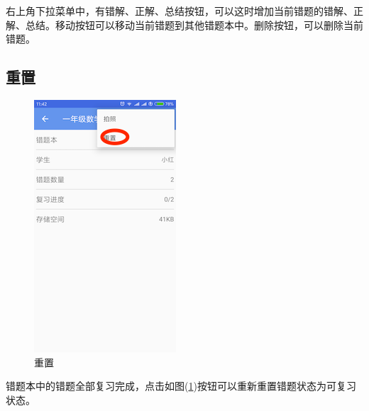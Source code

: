右上角下拉菜单中，有错解、正解、总结按钮，可以这时增加当前错题的错解、正解、总结。移动按钮可以移动当前错题到其他错题本中。删除按钮，可以删除当前错题。

\subsection{重置}
\begin{figure}[H]
	\centering
	\includegraphics{img/26.png}
	\caption{重置}
	\label{img26}
\end{figure}
错题本中的错题全部复习完成，点击如图(\ref{img26})按钮可以重新重置错题状态为可复习状态。